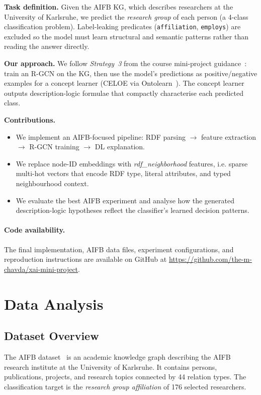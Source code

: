 \documentclass[runningheads]{llncs}
\begin{document}
\textbf{Task definition.}
Given the AIFB KG, which describes researchers at the University of Karlsruhe, we predict the
\emph{research group} of each person (a 4-class classification problem).
Label-leaking predicates (\texttt{affiliation}, \texttt{employs}) are excluded so the model must learn
structural and semantic patterns rather than reading the answer directly.

\textbf{Our approach.}
We follow \emph{Strategy~3} from the course mini-project guidance~\cite{xai26miniproject}: train an R-GCN on the KG, then use the model's predictions
as positive/negative examples for a concept learner (CELOE via Ontolearn~\cite{ontolearn2023}).
The concept learner outputs description-logic formulae that compactly characterise each predicted class.

\textbf{Contributions.}
\begin{itemize}
    \item We implement an AIFB-focused pipeline: RDF parsing $\to$ feature extraction $\to$ R-GCN training $\to$ DL explanation.
    \item We replace node-ID embeddings with \emph{rdf\_neighborhood} features, i.e. sparse multi-hot vectors that encode RDF type, literal attributes, and typed neighbourhood context.
    \item We evaluate the best AIFB experiment and analyse how the generated description-logic hypotheses reflect the classifier's learned decision patterns.
\end{itemize}

\paragraph{Code availability.}
The final implementation, AIFB data files, experiment configurations, and reproduction instructions are available on GitHub at
\url{https://github.com/the-m-chavda/xai-mini-project}.

\section{Data Analysis}

\subsection{Dataset Overview}

The AIFB dataset~\cite{bloehdorn2007} is an academic knowledge graph describing the AIFB research institute
at the University of Karlsruhe.
It contains persons, publications, projects, and research topics connected by 44 relation types.
The classification target is the \emph{research group affiliation} of 176 selected researchers.
\end{document}
